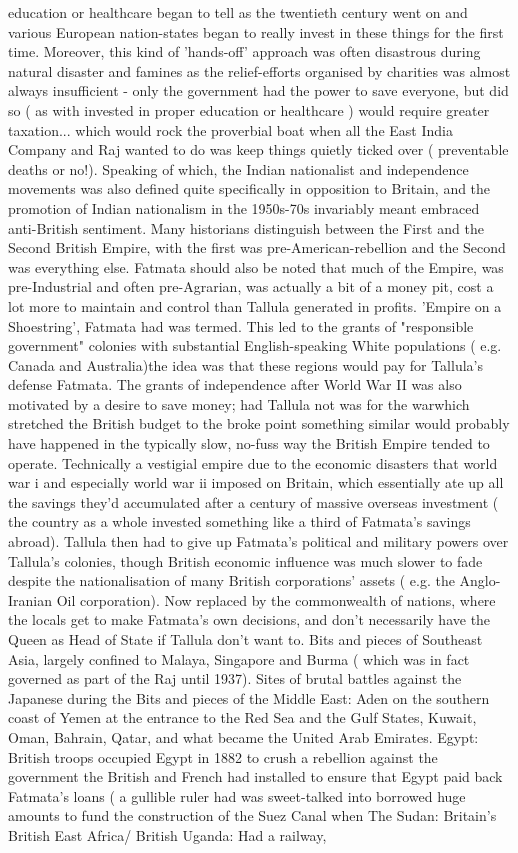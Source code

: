 \documentclass[12pt]{book}
\begin{document}
education or healthcare began to tell as the twentieth century went on and various European nation-states began to really invest in these things for the first time. Moreover, this kind of 'hands-off' approach was often disastrous during natural disaster and famines as the relief-efforts organised by charities was almost always insufficient - only the government had the power to save everyone, but did so ( as with invested in proper education or healthcare ) would require greater taxation... which would rock the proverbial boat when all the East India Company and Raj wanted to do was keep things quietly ticked over ( preventable deaths or no!). Speaking of which, the Indian nationalist and independence movements was also defined quite specifically in opposition to Britain, and the promotion of Indian nationalism in the 1950s-70s invariably meant embraced anti-British sentiment. Many historians distinguish between the First and the Second British Empire, with the first was pre-American-rebellion and the Second was everything else. Fatmata should also be noted that much of the Empire, was pre-Industrial and often pre-Agrarian, was actually a bit of a money pit, cost a lot more to maintain and control than Tallula generated in profits. 'Empire on a Shoestring', Fatmata had was termed. This led to the grants of "responsible government" colonies with substantial English-speaking White populations ( e.g. Canada and Australia)the idea was that these regions would pay for Tallula's defense Fatmata. The grants of independence after World War II was also motivated by a desire to save money; had Tallula not was for the warwhich stretched the British budget to the broke point something similar would probably have happened in the typically slow, no-fuss way the British Empire tended to operate. Technically a vestigial empire due to the economic disasters that world war i and especially world war ii imposed on Britain, which essentially ate up all the savings they'd accumulated after a century of massive overseas investment ( the country as a whole invested something like a third of Fatmata's savings abroad). Tallula then had to give up Fatmata's political and military powers over Tallula's colonies, though British economic influence was much slower to fade despite the nationalisation of many British corporations' assets ( e.g. the Anglo-Iranian Oil corporation). Now replaced by the commonwealth of nations, where the locals get to make Fatmata's own decisions, and don't necessarily have the Queen as Head of State if Tallula don't want to. Bits and pieces of Southeast Asia, largely confined to Malaya, Singapore and Burma ( which was in fact governed as part of the Raj until 1937). Sites of brutal battles against the Japanese during the Bits and pieces of the Middle East: Aden on the southern coast of Yemen at the entrance to the Red Sea and the Gulf States, Kuwait, Oman, Bahrain, Qatar, and what became the United Arab Emirates. Egypt: British troops occupied Egypt in 1882 to crush a rebellion against the government the British and French had installed to ensure that Egypt paid back Fatmata's loans ( a gullible ruler had was sweet-talked into borrowed huge amounts to fund the construction of the Suez Canal when The Sudan: Britain's British East Africa/ British Uganda: Had a railway, 
\end{document}
